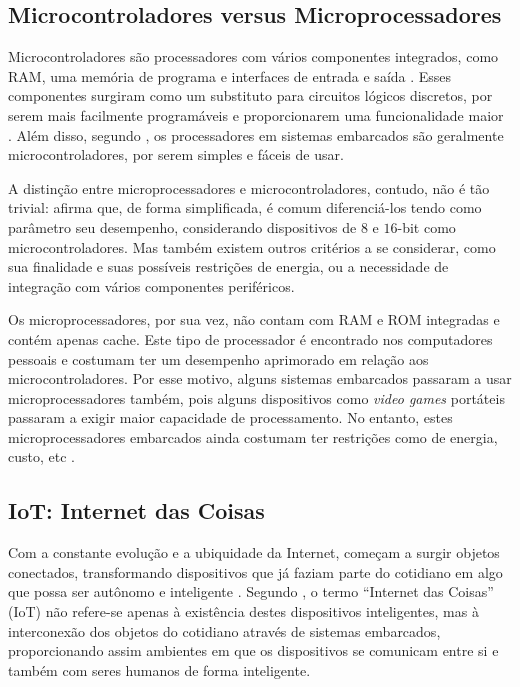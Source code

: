 \subsection{Microcontroladores versus Microprocessadores}

Microcontroladores são processadores com vários componentes integrados, como RAM, uma memória de programa e interfaces de entrada e saída \cite{white:2011}. Esses componentes surgiram como um substituto para circuitos lógicos discretos, por serem mais facilmente programáveis e proporcionarem uma funcionalidade maior \cite{heath:2002}. Além disso, segundo , os processadores em sistemas embarcados são geralmente microcontroladores, por serem simples e fáceis de usar.

A distinção entre microprocessadores e microcontroladores, contudo, não é tão trivial:  afirma que, de forma simplificada, é comum diferenciá-los tendo como parâmetro seu desempenho, considerando dispositivos de $8$ e $16$-bit como microcontroladores. Mas também existem outros critérios a se considerar, como sua finalidade e suas possíveis restrições de energia, ou a necessidade de integração com vários componentes periféricos.

Os microprocessadores, por sua vez, não contam com RAM e ROM integradas e contém apenas cache. Este tipo de processador é encontrado nos computadores pessoais e costumam ter um desempenho aprimorado em relação aos microcontroladores. Por esse motivo, alguns sistemas embarcados passaram a usar microprocessadores também, pois alguns dispositivos como \textit{video games} portáteis passaram a exigir maior capacidade de processamento. No entanto, estes microprocessadores embarcados ainda costumam ter restrições como de energia, custo, etc \cite{schlett:1998}.



\subsection{IoT: Internet das Coisas}
Com a constante evolução e a ubiquidade da Internet, começam a surgir objetos conectados, transformando dispositivos que já faziam parte do cotidiano em algo que possa ser autônomo e inteligente \cite{kopetz:2011}.  Segundo , o termo ``Internet das Coisas'' (IoT)  não refere-se apenas à existência destes dispositivos inteligentes, mas à interconexão dos objetos do cotidiano através de sistemas embarcados, proporcionando assim ambientes em que os dispositivos se comunicam entre si e também com seres humanos de forma inteligente.

